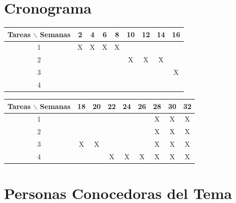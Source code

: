 \documentclass[12pt]{article}
\begin{document}


\section{Cronograma}

\begin{table}[htb]
	\begin{tabular}{|c|cccccccc| }
	\hline
	Tareas $\backslash$ Semanas & 2 & 4 & 6 & 8 & 10 & 12 & 14 & 16\\
	\hline
	1 & X & X & X  &  X &   &   & &  \\
	2 &   &  & &  & X & X &X  & \\
	3 &   &   &  &  &   &   & & X\\
	4 &  &  &  &  &  &  & & \\
	\hline
	\end{tabular}
\end{table}
\begin{table}[htb]
	\begin{tabular}{|c|cccccccc| }
	\hline
	Tareas $\backslash$ Semanas & 18 & 20 & 22 & 24 & 26 & 28 & 30 & 32\\
	\hline
	1 &  &  &   &   &   &X  &X & X  \\
	2 &   &  &  &  & & X &  X &X\\
	3 & X  &X   & &  &   &  X &X & X\\
	4 &  &  & X & X & X &  X&X  &X \\
	\hline
	\end{tabular}
\end{table}
\vspace{1mm}

\section{Personas Conocedoras del Tema}
\end{document}

